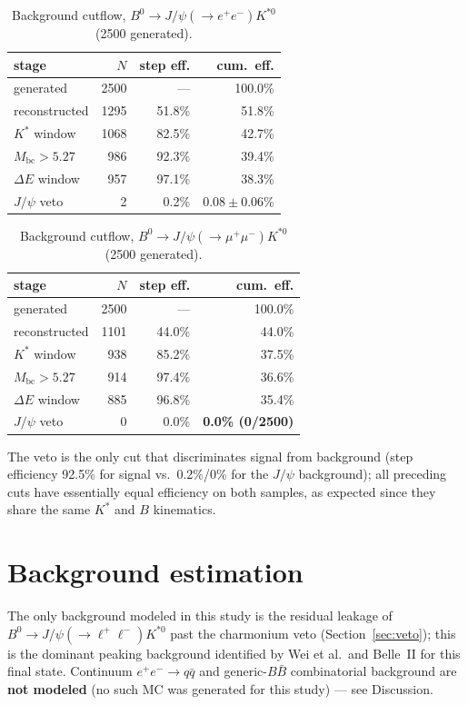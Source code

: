 \documentclass[11pt]{article}
\newcommand{\Kst}{K^{*0}}
\newcommand{\Mbc}{M_{\mathrm{bc}}}
\newcommand{\dE}{\Delta E}
\newcommand{\jpsi}{J/\psi}
\begin{document}
\begin{table}[htbp]
\centering
\begin{tabular}{lrrr}
\toprule
stage & $N$ & step eff. & cum.\ eff. \\
\midrule
generated & 2500 & --- & 100.0\% \\
reconstructed & 1295 & 51.8\% & 51.8\% \\
$K^{*}$ window & 1068 & 82.5\% & 42.7\% \\
$\Mbc > 5.27$ & 986 & 92.3\% & 39.4\% \\
$\dE$ window & 957 & 97.1\% & 38.3\% \\
$\jpsi$ veto & 2 & 0.2\% & $\mathbf{0.08 \pm 0.06\%}$ \\
\bottomrule
\end{tabular}
\caption{Background cutflow, $B^0\to\jpsi(\to e^+e^-)\Kst$
(2500 generated).}
\label{tab:cutflow_bkg_ee}
\end{table}

\begin{table}[htbp]
\centering
\begin{tabular}{lrrr}
\toprule
stage & $N$ & step eff. & cum.\ eff. \\
\midrule
generated & 2500 & --- & 100.0\% \\
reconstructed & 1101 & 44.0\% & 44.0\% \\
$K^{*}$ window & 938 & 85.2\% & 37.5\% \\
$\Mbc > 5.27$ & 914 & 97.4\% & 36.6\% \\
$\dE$ window & 885 & 96.8\% & 35.4\% \\
$\jpsi$ veto & 0 & 0.0\% & \textbf{0.0\% (0/2500)} \\
\bottomrule
\end{tabular}
\caption{Background cutflow, $B^0\to\jpsi(\to\mu^+\mu^-)\Kst$
(2500 generated).}
\label{tab:cutflow_bkg_mumu}
\end{table}

The veto is the only cut that discriminates signal from background
(step efficiency 92.5\% for signal vs.\ 0.2\%/0\% for the $\jpsi$
background); all preceding cuts have essentially equal efficiency on
both samples, as expected since they share the same $K^{*}$ and $B$
kinematics.

\section{Background estimation}
\label{sec:bkgest}

The only background modeled in this study is the residual leakage of
$B^0\to\jpsi(\to\ell^{+}\ell^{-})\Kst$ past the charmonium veto
(Section~\ref{sec:veto}); this is the dominant peaking background
identified by Wei et al.\ and Belle~II for this final state. Continuum
$e^+e^-\to q\bar q$ and generic-$B\bar B$ combinatorial background are
\textbf{not modeled} (no such MC was generated for this study) --- see
Discussion.
\end{document}
